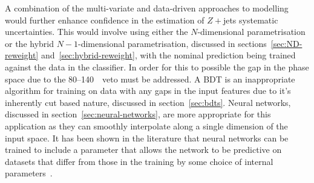 A combination of the multi-variate and data-driven approaches to modelling would
further enhance confidence in the estimation of $Z+$jets systematic
uncertainties. This would involve using either the $N$-dimensional
parametrisation or the hybrid $N-1$-dimensional parametrisation, discussed in
sections~\ref{sec:ND-reweight} and~\ref{sec:hybrid-reweight}, with the nominal
prediction being trained against the data in the classifier. In order for this
to possible the gap in the phase space due to the 80--140~\GeV\ veto must be
addressed. A BDT is an inappropriate algorithm for training on data with any
gaps in the input features due to it's inherently cut based nature, discussed in
section~\ref{sec:bdts}. Neural networks, discussed in
section~\ref{sec:neural-networks}, are more appropriate for this application as
they can smoothly interpolate along a single dimension of the input space. It
has been shown in the literature that neural networks can be trained to include
a parameter that allows the network to be predictive on datasets that differ
from those in the training by some choice of internal
parameters~\cite{param-hep, param-hep-2}.




